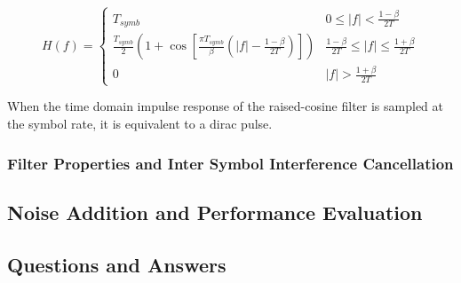 \begin{equation}
	H(f) = \begin{cases}
		T_{symb} & 0 \le |f| < \frac{1-\beta}{2T} \\
		\frac{T_{symb}}{2} \left(1 + \cos\left[\frac{\pi T_{symb}}{\beta}\left(|f| - \frac{1-\beta}{2T}\right)\right]\right) & \frac{1-\beta}{2T} \le |f| \le \frac{1+\beta}{2T} \\
		0 & |f| > \frac{1+\beta}{2T}
	\end{cases}
\end{equation}

When the time domain impulse response of the raised-cosine filter is sampled at the symbol rate, it is equivalent to a dirac pulse.



\subsubsection{Filter Properties and Inter Symbol Interference Cancellation}
\subsection{Noise Addition and Performance Evaluation}
\subsection{Questions and Answers}
